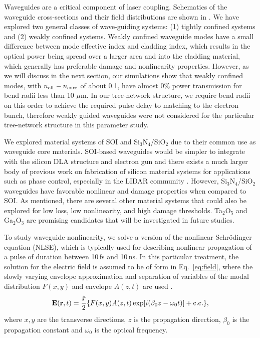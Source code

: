 Waveguides are a critical component of laser coupling.
Schematics of the waveguide cross-sections and their field distributions are shown in .
We have explored two general classes of wave-guiding systems: (1) tightly confined systems and (2) weakly confined systems.
Weakly confined waveguide modes have a small difference between mode effective index and cladding index, which results in the optical power being spread over a larger area and into the cladding material, which generally has preferable damage and nonlinearity properties.
However, as we will discuss in the next section, our simulations show that weakly confined modes, with $n_{\rm{eff}} - n_{\rm{core}}$ of about 0.1, have almost 0$\%$ power transmission for bend radii less than 10 $\mu$m.
In our tree-network structure, we  require bend radii on this order to achieve the required pulse delay to matching to the electron bunch, therefore weakly guided waveguides were not considered for the particular tree-network structure in this parameter study.


We explored material systems of SOI and Si$_3$N$_4$/SiO$_2$ due to their common use as waveguide core materials.
SOI-based waveguides would be simpler to integrate with the silicon DLA structure and electron gun and there exists a much larger body of previous work on fabrication of silicon material systems for applications such as phase control, especially in the LIDAR community \cite{yaacobi2014integrated, kwong20111}.
However, Si$_3$N$_4$/SiO$_2$ waveguides have favorable nonlinear and damage properties when compared to SOI.
As mentioned, there are several other material systems that could also be explored for low loss, low nonlinearity, and high damage thresholds.
Ta$_2$O$_5$ \cite{belt2017ultra} and Ga$_2$O$_3$ are promising candidates that will be investigated in future studies.

To study waveguide nonlinearity, we solve a version of the nonlinear Schr\"{o}dinger equation (NLSE), which is typically used for describing nonlinear propagation of a pulse of duration between 10\,fs and 10\,ns. In this particular treatment, the solution for the electric field is assumed to be of form in Eq.~\ref{eq:field}, where the slowly varying envelope approximation and separation of variables of the modal distribution $F(x,y)$ and envelope $A(z,t)$ are used \cite{agrawal2007nonlinear}.
\begin{equation}
\mathbf{E(r},t)=\frac{\hat{x}}{2}\{F(x,y)A(z,t)\exp[i(\beta_0 z-\omega_0t)]+\rm{c.c.}\},
\label{eq:field}
\end{equation}
where $x,y$ are the transverse directions, $z$ is the propagation direction, $\beta_0$ is the propagation constant and $\omega_0$ is the optical frequency. 

